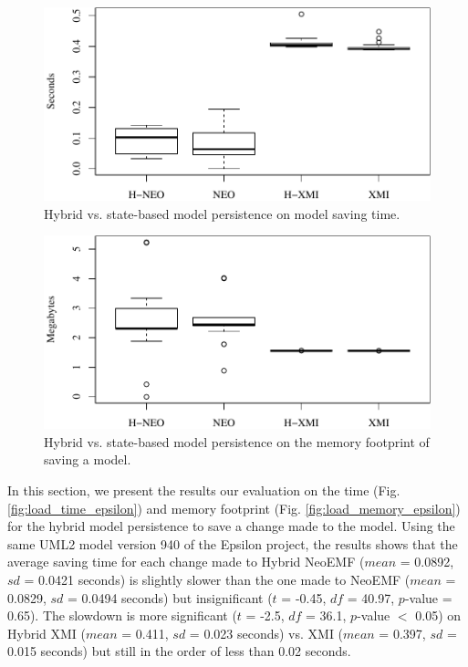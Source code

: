 \documentclass[10pt,conference]{IEEEtran}
\begin{document}
\begin{figure}[ht]
    \includegraphics[width=\linewidth]{images/save_time_epsilon}
    \caption{Hybrid vs. state-based model persistence on model saving time.}
    \label{fig:save_time_epsilon}
\end{figure}

\begin{figure}[ht]
    \includegraphics[width=\linewidth]{images/save_memory_epsilon}
    \caption{Hybrid vs. state-based model persistence on the memory footprint of saving a model.}
    \label{fig:save_memory_epsilon}
\end{figure}

In this section, we present the results our evaluation on the time (Fig. \ref{fig:load_time_epsilon}) and memory footprint (Fig. \ref{fig:load_memory_epsilon}) for the hybrid model persistence to save a change made to the model. Using the same UML2 model version 940 of the Epsilon project, the results shows that the average saving time for each change made to Hybrid NeoEMF ($mean$ = 0.0892, $sd$ = 0.0421 seconds) is slightly slower than the one made to NeoEMF ($mean$ = 0.0829, $sd$ = 0.0494 seconds) but insignificant ($t$ = -0.45, $df$ = 40.97, $p$-value = 0.65). The slowdown is more significant ($t$ = -2.5, $df$ = 36.1, $p$-value $<$ 0.05) on Hybrid XMI ($mean$ = 0.411, $sd$ = 0.023 seconds) vs. XMI ($mean$ = 0.397, $sd$ = 0.015 seconds) but still in the order of less than 0.02 seconds.  
\end{document}
